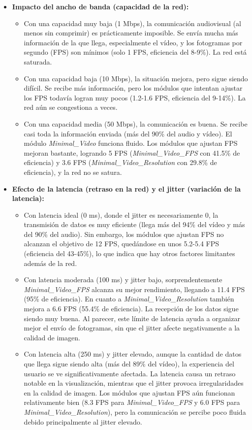 \begin{itemize}
\item \textbf{Impacto del ancho de banda (capacidad de la red):}
\begin{itemize}
\item Con una capacidad muy baja (1 Mbps), la comunicación audiovisual (al menos sin comprimir) es prácticamente imposible. Se envía mucha más información de la que llega, especialmente el vídeo, y los fotogramas por segundo (FPS) son mínimos (solo 1 FPS, eficiencia del 8-9\%). La red está saturada.
\item Con una capacidad baja (10 Mbps), la situación mejora, pero sigue siendo difícil. Se recibe más información, pero los módulos que intentan ajustar los FPS todavía logran muy pocos (1.2-1.6 FPS, eficiencia del 9-14\%). La red aún se congestiona a veces.
\item Con una capacidad media (50 Mbps), la comunicación es buena. Se recibe casi toda la información enviada (más del 90\% del audio y vídeo). El módulo \textit{Minimal\_Video} funciona fluido. Los módulos que ajustan FPS mejoran bastante, logrando 5 FPS (\textit{Minimal\_Video\_FPS} con 41.5\% de eficiencia) y 3.6 FPS (\textit{Minimal\_Video\_Resolution} con 29.8\% de eficiencia), y la red no se satura.
\end{itemize}
\item \textbf{Efecto de la latencia (retraso en la red) y el jitter (variación de la latencia):}
\begin{itemize}
    \item Con latencia ideal (0 ms), donde el jitter es necesariamente 0, la transmisión de datos es muy eficiente (llega más del 94\% del vídeo y más del 90\% del audio). Sin embargo, los módulos que ajustan FPS no alcanzan el objetivo de 12 FPS, quedándose en unos 5.2-5.4 FPS (eficiencia del 43-45\%), lo que indica que hay otros factores limitantes además de la red.
    \item Con latencia moderada (100 ms) y jitter bajo, sorprendentemente \textit{Minimal\_Video\_FPS} alcanza su mejor rendimiento, llegando a 11.4 FPS (95\% de eficiencia). En cuanto a \textit{Minimal\_Video\_Resolution} también mejora a 6.6 FPS (55.4\% de eficiencia). La recepción de los datos sigue siendo muy buena. Al parecer, este límite de latencia ayuda a organizar mejor el envío de fotogramas, sin que el jitter afecte negativamente a la calidad de imagen.
    \item Con latencia alta (250 ms) y jitter elevado, aunque la cantidad de datos que llega sigue siendo alta (más del 89\% del vídeo), la experiencia del usuario se ve significativamente afectada. La latencia causa un retraso notable en la visualización, mientras que el jitter provoca irregularidades en la calidad de imagen. Los módulos que ajustan FPS aún funcionan relativamente bien (8.3 FPS para \textit{Minimal\_Video\_FPS} y 6.0 FPS para \textit{Minimal\_Video\_Resolution}), pero la comunicación se percibe poco fluida debido principalmente al jitter elevado.
\end{itemize}
\vspace{\baselineskip}


\end{itemize}
